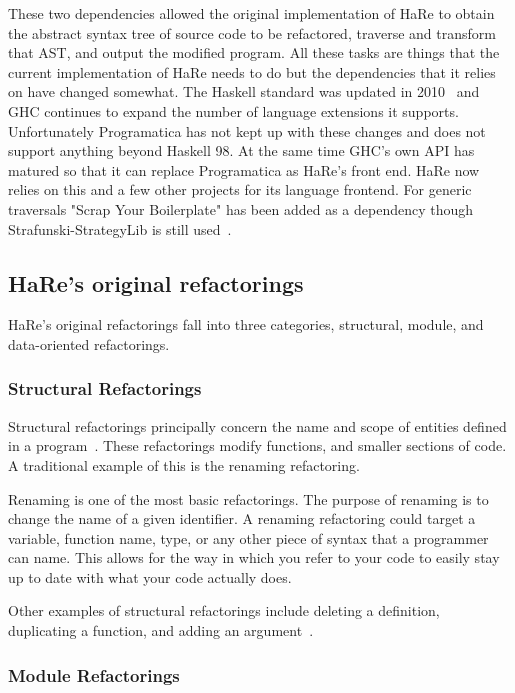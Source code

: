 These two dependencies allowed the original implementation of HaRe to obtain the abstract syntax tree of source code to be refactored, traverse and transform that AST, and output the modified program. All these tasks are things that the current implementation of HaRe needs to do but the dependencies that it relies on have changed somewhat. The Haskell standard was updated in 2010~\citep{haskell2010} and GHC continues to expand the number of language extensions it supports. Unfortunately Programatica has not kept up with these changes and does not support anything beyond Haskell 98. At the same time GHC's own API has matured so that it can replace Programatica as HaRe's front end. HaRe now relies on this and a few other projects for its language frontend. For generic traversals "Scrap Your Boilerplate" has been added as a dependency though Strafunski-StrategyLib is still used~\citep{syb}.
 
\subsection{HaRe's original refactorings}\label{origRefactorings}

HaRe's original refactorings fall into three categories, structural, module, and data-oriented refactorings.

\subsubsection{Structural Refactorings}

Structural refactorings principally concern the name and scope of entities defined in a program~\citep{huiqingThesis}. These refactorings modify functions, and smaller sections of code. A traditional example of this is the renaming refactoring. 

Renaming is one of the most basic refactorings. The purpose of renaming is to change the name of a given identifier. A renaming refactoring could target a variable, function name, type, or any other piece of syntax that a programmer can name. This allows for the way in which you refer to your code to easily stay up to date with what your code actually does. 

Other examples of structural refactorings include deleting a definition, duplicating a function, and adding an argument~\citep{huiqingThesis}.

\subsubsection{Module Refactorings}

